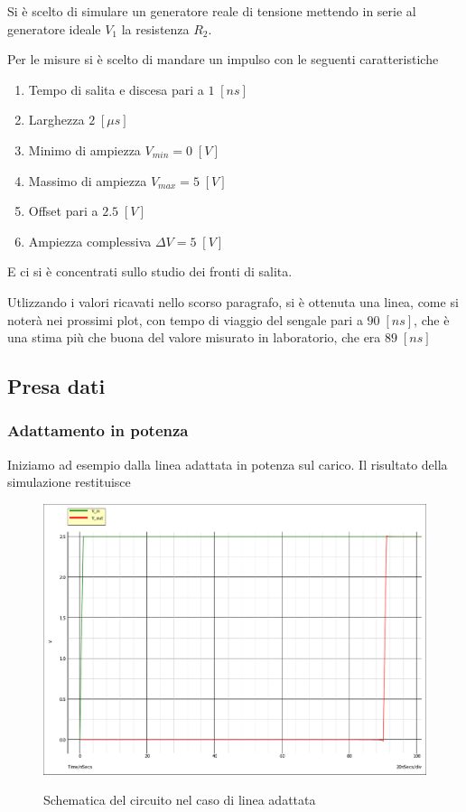 \documentclass[a4paper,12pt]{report}
\begin{document}
Si è scelto di simulare un generatore reale di tensione mettendo in serie al generatore ideale $V_1$ la resistenza $R_2$.

Per le misure si è scelto di mandare un impulso con le seguenti caratteristiche
\begin{enumerate}
	\item Tempo di salita e discesa pari a $1 \; [ns]$
	\item Larghezza $2 \; [\mu s]$
	\item Minimo di ampiezza $V_{min} = 0 \; [V]$
	\item Massimo di ampiezza $V_{max} = 5 \; [V]$
	\item Offset pari a  $2.5 \; [V]$
	\item Ampiezza complessiva  $\Delta V= 5 \; [V]$
\end{enumerate}

E ci si è concentrati sullo studio dei fronti di salita.

Utlizzando i valori ricavati nello scorso paragrafo, si è ottenuta una linea, come si noterà nei prossimi plot, con tempo di viaggio del sengale pari a $90 \; [ns]$, che è una stima più che buona del valore misurato in laboratorio, che era  $89 \; [ns]$


\newpage

\subsection{Presa dati}

\subsubsection{Adattamento in potenza}

Iniziamo ad esempio dalla linea adattata in potenza sul carico. Il risultato della simulazione restituisce
\begin{figure}[!htb]
	\centering
	\includegraphics[width=\textwidth]{pictures/Adattamento_in_potenza.pdf}
	\label{ergwg}
	\caption{\label{luegregegl} \small Schematica del circuito nel caso di linea adattata}
\end{figure}
\end{document}
